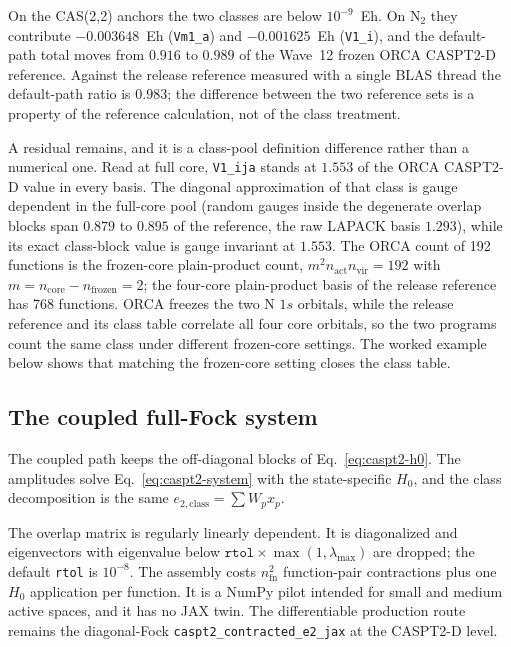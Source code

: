 On the CAS(2,2) anchors the two classes are below $10^{-9}$~Eh.  On
N$_2$ they contribute $-0.003648$~Eh (\texttt{Vm1\_a}) and
$-0.001625$~Eh (\texttt{V1\_i}), and the default-path total moves from
$0.916$ to $0.989$ of the Wave~12 frozen ORCA CASPT2-D reference.
Against the release reference measured with a single BLAS thread the
default-path ratio is $0.983$; the difference between the two reference
sets is a property of the reference calculation, not of the class
treatment.

A residual remains, and it is a class-pool definition difference rather
than a numerical one.  Read at full core, \texttt{V1\_ija} stands at
$1.553$ of the ORCA CASPT2-D value in every basis.  The diagonal
approximation of that class is gauge dependent in the full-core pool
(random gauges inside the degenerate overlap blocks span $0.879$ to
$0.895$ of the reference, the raw LAPACK basis $1.293$), while its
exact class-block value is gauge invariant at $1.553$.  The ORCA count
of 192 functions is the frozen-core plain-product count,
$m^{2}n_{\mathrm{act}}n_{\mathrm{vir}}=192$ with
$m=n_{\mathrm{core}}-n_{\mathrm{frozen}}=2$; the four-core
plain-product basis of the release reference has 768 functions.  ORCA
freezes the two N $1s$ orbitals, while the release reference and its
class table correlate all four core orbitals, so the two programs count
the same class under different frozen-core settings.  The worked
example below shows that matching the frozen-core setting closes the
class table.

\subsection{The coupled full-Fock system}

The coupled path keeps the off-diagonal blocks of
Eq.~\eqref{eq:caspt2-h0}.  The amplitudes solve
Eq.~\eqref{eq:caspt2-system} with the state-specific $H_0$, and the
class decomposition is the same $e_{2,\mathrm{class}}=\sum W_px_p$.

The overlap matrix is regularly linearly dependent.  It is
diagonalized and eigenvectors with eigenvalue below
$\texttt{rtol}\times\max(1,\lambda_{\max})$ are dropped; the default
\texttt{rtol} is $10^{-8}$.  The assembly costs $n_{\mathrm{fn}}^2$
function-pair contractions plus one $H_0$ application per function.  It
is a NumPy pilot intended for small and medium active spaces, and it
has no JAX twin.  The differentiable production route remains the
diagonal-Fock \texttt{caspt2\_contracted\_e2\_jax} at the CASPT2-D
level.

